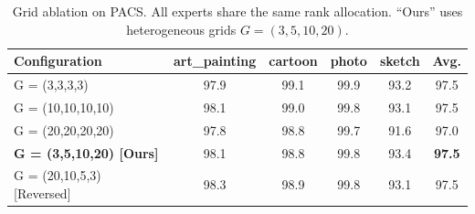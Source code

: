 \begin{table}[t]
\centering
\caption{Grid ablation on PACS. All experts share the same rank allocation. ``Ours'' uses heterogeneous grids $G=(3,5,10,20)$.}
\label{tab:grid_ablation}
\begin{tabular}{lccccc}
\toprule
Configuration & art_painting & cartoon & photo & sketch & Avg. \\
\midrule
G = (3,3,3,3) & 97.9 & 99.1 & 99.9 & 93.2 & 97.5 \\
G = (10,10,10,10) & 98.1 & 99.0 & 99.8 & 93.1 & 97.5 \\
G = (20,20,20,20) & 97.8 & 98.8 & 99.7 & 91.6 & 97.0 \\
\textbf{G = (3,5,10,20) [Ours]} & 98.1 & 98.8 & 99.8 & 93.4 & \textbf{97.5} \\
G = (20,10,5,3) [Reversed] & 98.3 & 98.9 & 99.8 & 93.1 & 97.5 \\
\bottomrule
\end{tabular}
\end{table}